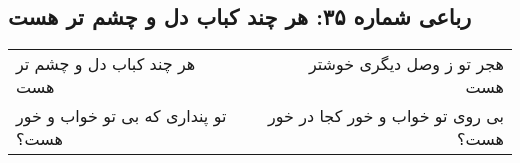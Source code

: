 \begin{center}
\section*{رباعی شماره ۳۵: هر چند کباب دل و چشم تر هست}
\label{sec:035}
\begin{longtable}{l p{0.5cm} r}
هر چند کباب دل و چشم تر هست
&&
هجر تو ز وصل دیگری خوشتر هست
\\
تو پنداری که بی تو خواب و خور هست؟
&&
بی روی تو خواب و خور کجا در خور هست؟
\\
\end{longtable}
\end{center}

